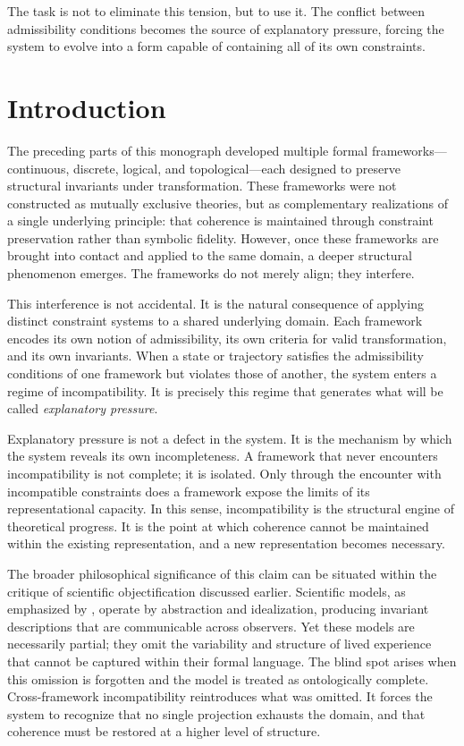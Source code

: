 \documentclass[11pt,openany]{book}
\begin{document}
The task is not to eliminate this tension, but to use it. The conflict between admissibility conditions becomes the source of explanatory pressure, forcing the system to evolve into a form capable of containing all of its own constraints.

\section{Introduction}
\label{sec:introduction-incompatibility}

The preceding parts of this monograph developed multiple
formal frameworks—continuous, discrete, logical, and
topological—each designed to preserve structural invariants
under transformation. These frameworks were not constructed
as mutually exclusive theories, but as complementary
realizations of a single underlying principle: that
coherence is maintained through constraint preservation
rather than symbolic fidelity. However, once these
frameworks are brought into contact and applied to the same
domain, a deeper structural phenomenon emerges. The
frameworks do not merely align; they interfere.

This interference is not accidental. It is the natural
consequence of applying distinct constraint systems to a
shared underlying domain. Each framework encodes its own
notion of admissibility, its own criteria for valid
transformation, and its own invariants. When a state or
trajectory satisfies the admissibility conditions of one
framework but violates those of another, the system enters
a regime of incompatibility. It is precisely this regime
that generates what will be called \emph{explanatory
pressure}.

Explanatory pressure is not a defect in the system. It is
the mechanism by which the system reveals its own
incompleteness. A framework that never encounters
incompatibility is not complete; it is isolated. Only
through the encounter with incompatible constraints does a
framework expose the limits of its representational
capacity. In this sense, incompatibility is the structural
engine of theoretical progress. It is the point at which
coherence cannot be maintained within the existing
representation, and a new representation becomes necessary.

The broader philosophical significance of this claim can be
situated within the critique of scientific objectification
discussed earlier. Scientific models, as emphasized by
, operate by abstraction and
idealization, producing invariant descriptions that are
communicable across observers. Yet these models are
necessarily partial; they omit the variability and
structure of lived experience that cannot be captured
within their formal language. The blind spot arises when
this omission is forgotten and the model is treated as
ontologically complete. Cross-framework incompatibility
reintroduces what was omitted. It forces the system to
recognize that no single projection exhausts the domain,
and that coherence must be restored at a higher level of
structure.
\end{document}
